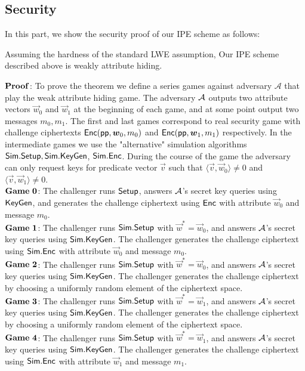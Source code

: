 \subsection{Security}
In this part, we show the security proof of our IPE scheme as follows:
\begin{theorem}
Assuming the hardness of the standard LWE assumption, Our IPE scheme described above is weakly attribute hiding.
\end{theorem}
\noindent $\mathbf{Proof}$: To prove the theorem we define a series games against adversary $\mathcal{A}$ that play the weak attribute hiding game. The adversary $\mathcal{A}$ outputs two attribute vectors $\vec{w}_{0}$ and $\vec{w}_{1}$ at the beginning of each game, and at some point output two messages $m_{0},m_{1}$. The first and last games correspond to real security game with challenge ciphertexts $\mathsf{Enc}(\mathsf{pp},\boldsymbol{w}_{0},m_{0})$ and $\mathsf{Enc}(\mathsf{pp},\boldsymbol{w}_{1},m_{1})$ respectively. In the intermediate games we use the "alternative" simulation algorithms $\mathsf{Sim}.\mathsf{Setup},\mathsf{Sim}.\mathsf{KeyGen}$, $\mathsf{Sim}.\mathsf{Enc}$. During the course of the game the adversary can only request keys for predicate vector $\vec{v}$ such that $\langle \vec{v}, \vec{w}_{0} \rangle \neq 0$ and $\langle \vec{v}, \vec{w}_{1} \rangle \neq 0$.\\[0.2cm]
$\mathbf{Game\ 0}$: The challenger runs $\mathsf{Setup}$, answers $\mathcal{A}$'s secret key queries using $\mathsf{KeyGen}$, and generates the challenge ciphertext using $\mathsf{Enc}$ with attribute $\vec{w}_{0}$ and message $m_{0}$.\\[0.2cm]
$\mathbf{Game\ 1}$: The challenger runs $\mathsf{Sim}.\mathsf{Setup}$ with $\vec{w}^{*}=\vec{w}_{0}$, and answers $\mathcal{A}$'s secret key queries using $\mathsf{Sim}.\mathsf{KeyGen}$. The challenger generates the challenge ciphertext using $\mathsf{Sim}.\mathsf{Enc}$ with attribute  $\vec{w}_{0}$ and message $m_{0}$.\\[0.2cm]
$\mathbf{Game\ 2}$: The challenger runs $\mathsf{Sim}.\mathsf{Setup}$ with $\vec{w}^{*}=\vec{w}_{0}$, and answers $\mathcal{A}$'s secret key queries using $\mathsf{Sim}.\mathsf{KeyGen}$. The challenger generates the challenge ciphertext by choosing a uniformly random element of the ciphertext space.\\[0.2cm]
$\mathbf{Game\ 3}$: The challenger runs $\mathsf{Sim}.\mathsf{Setup}$ with $\vec{w}^{*}=\vec{w}_{1}$, and answers $\mathcal{A}$'s secret key queries using $\mathsf{Sim}.\mathsf{KeyGen}$. The challenger generates the challenge ciphertext by choosing a uniformly random element of the ciphertext space.\\[0.2cm]
$\mathbf{Game\ 4}$: The challenger runs $\mathsf{Sim}.\mathsf{Setup}$ with $\vec{w}^{*}=\vec{w}_{1}$, and answers $\mathcal{A}$'s secret key queries using $\mathsf{Sim}.\mathsf{KeyGen}$. The challenger generates the challenge ciphertext using $\mathsf{Sim}.\mathsf{Enc}$ with attribute  $\vec{w}_{1}$ and message $m_{1}$.\\[0.2cm]
